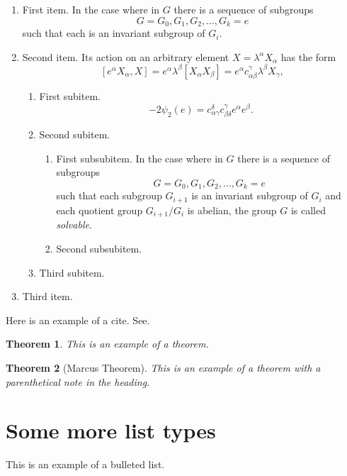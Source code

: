 \documentclass{amsart}
\newtheorem{theorem}{Theorem}[section]
\theoremstyle{definition}
\theoremstyle{remark}
\numberwithin{equation}{section}
\begin{document}
\begin{enumerate}
\item First item.
In the case where in $G$ there is a sequence of subgroups
\[
G = G_0, G_1, G_2, \dots, G_k = e
\]
such that each is an invariant subgroup of $G_i$.

\item Second item.
Its action on an arbitrary element $X = \lambda^\alpha X_\alpha$ has the
form
\begin{equation}\label{eq:action}
[e^\alpha X_\alpha, X] = e^\alpha \lambda^\beta
[X_\alpha X_\beta] = e^\alpha c^\gamma_{\alpha \beta}
 \lambda^\beta X_\gamma,
\end{equation}

\begin{enumerate}
\item First subitem.
\[
- 2\psi_2(e) =  c_{\alpha \gamma}^\delta c_{\beta \delta}^\gamma
e^\alpha e^\beta.
\]

\item Second subitem.
\begin{enumerate}
\item First subsubitem.
In the case where in $G$ there is a sequence of subgroups
\[
G = G_0, G_1, G_2, \ldots, G_k = e
\]
such that each subgroup $G_{i+1}$ is an invariant subgroup of $G_i$ and
each quotient group $G_{i+1}/G_{i}$ is abelian, the group $G$ is called
\textit{solvable}.

\item Second subsubitem.
\end{enumerate}
\item Third subitem.
\end{enumerate}
\item Third item.
\end{enumerate}

Here is an example of a cite. See.

\begin{theorem}
This is an example of a theorem.
\end{theorem}

\begin{theorem}[Marcus Theorem]
This is an example of a theorem with a parenthetical note in the
heading.
\end{theorem}

\section{Some more list types}
This is an example of a bulleted list.
\end{document}
